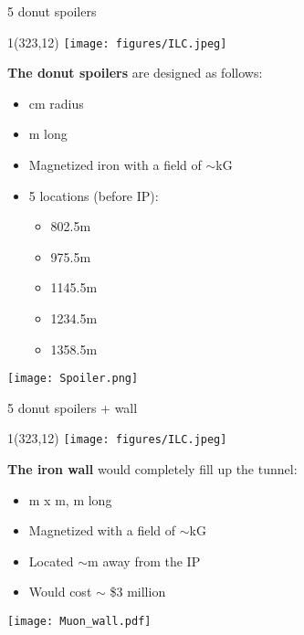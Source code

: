 \documentclass[xcolor={dvipsnames}]{beamer}
\newcommand{\ilclogo}{
  \setlength{\TPHorizModule}{1pt}
  \setlength{\TPVertModule}{1pt}
  \begin{textblock}{1}(323,12)
   \texttt{[image: figures/ILC.jpeg]}
  \end{textblock}
}
\begin{document}
\begin{frame}{5 donut spoilers}
\ilclogo
\textbf{The donut spoilers} are designed as follows:
\begin{itemize}
 \item \unit[70]{cm} radius
 \item \unit[5]{m} long
 \item Magnetized iron with a field of $\sim$\unit[10-19]{kG}
 \item 5 locations (before IP):
 \begin{itemize}
  \item 802.5m
  \item 975.5m
  \item 1145.5m
  \item 1234.5m
  \item 1358.5m
 \end{itemize}

\end{itemize}
\begin{center}
\texttt{[image: Spoiler.png]}
\end{center}
\end{frame}

\begin{frame}{5 donut spoilers + wall}
\ilclogo
\textbf{The iron wall} would completely fill up the tunnel:
\begin{itemize}
 \item \unit[5]{m} x \unit[5]{m}, \unit[5]{m} long
 \item Magnetized with a field of $\sim$\unit[16]{kG}
 \item Located $\sim$\unit[400]{m} away from the IP
 \item Would cost $\sim$ \$3 million
\end{itemize}
\begin{center}
\texttt{[image: Muon\_wall.pdf]}
\end{center}
\end{frame}
\end{document}
